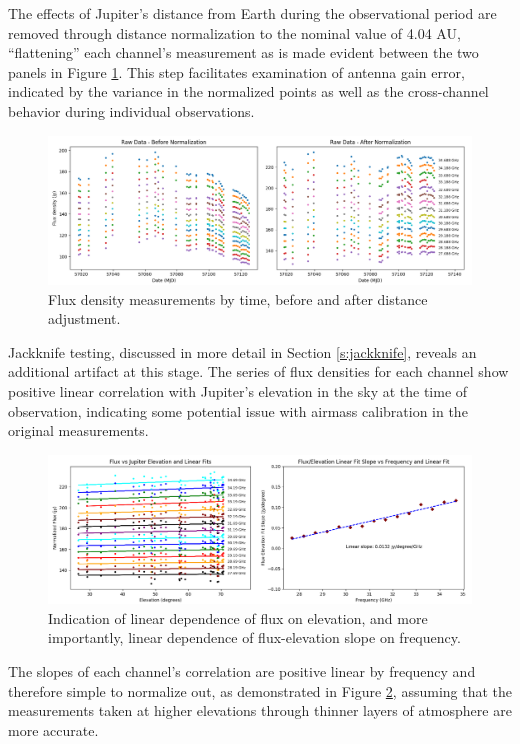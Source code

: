 \documentclass{article}
\begin{document}
	The effects of Jupiter's distance from Earth during the observational period are removed through distance normalization to the nominal value of 4.04 AU, ``flattening'' each channel's measurement as is made evident between the two panels in Figure \ref{fig:raw}.
	This step facilitates examination of antenna gain error, indicated by the variance in the normalized points as well as the cross-channel behavior during individual observations.
	\begin{figure}
		\centering
		\includegraphics[width=\textwidth]{final_raw.png}
		\caption{\label{fig:raw}Flux density measurements by time, before and after distance adjustment.}
	\end{figure}
	Jackknife testing, discussed in more detail in Section \ref{s:jackknife}, reveals an additional artifact at this stage.
	The series of flux densities for each channel show positive linear correlation with Jupiter's elevation in the sky at the time of observation, indicating some potential issue with airmass calibration in the original measurements.
	\begin{figure}
		\centering
		\includegraphics[width=\textwidth]{final_airmass.png}
		\caption{\label{fig:air}Indication of linear dependence of flux on elevation, and more importantly, linear dependence of flux-elevation slope on frequency.}
	\end{figure}
	The slopes of each channel's correlation are positive linear by frequency and therefore simple to normalize out, as demonstrated in Figure \ref{fig:air}, assuming that the measurements taken at higher elevations through thinner layers of atmosphere are more accurate.
\end{document}
